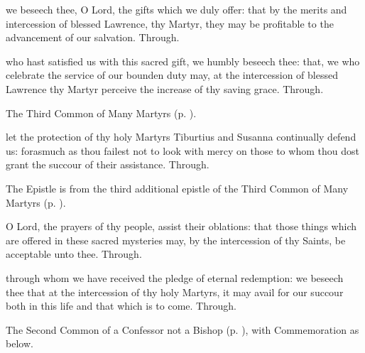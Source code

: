 
\secret
{} we beseech thee, O Lord, the gifts which we duly offer: that by the merits and intercession of blessed Lawrence, thy Martyr, they may be profitable to the advancement of our salvation. Through.


\postcommunion
{} who hast satisfied us with this sacred gift, we humbly beseech thee: that, we who celebrate the service of our bounden duty may, at the intercession of blessed Lawrence thy Martyr perceive the increase of thy saving grace. Through.



\begin{rubric}
	The Third Common of Many Martyrs (p. \pageref{CommonMartyrsIII}).
\end{rubric}

\collect
{} let the protection of thy holy Martyrs Tiburtius and Susanna continually defend us: forasmuch as thou failest not to look with mercy on those to whom thou dost grant the succour of their assistance. Through.

\begin{rubric}
	The Epistle is from the third additional epistle of the Third Common of Many Martyrs (p. \pageref{Romans818}).
\end{rubric}

\secret
{} O Lord, the prayers of thy people, assist their oblations: that those things which are offered in these sacred mysteries may, by the intercession of thy Saints, be acceptable unto thee. Through.

\postcommunion
{} through whom we have received the pledge of eternal redemption: we beseech thee that at the intercession of thy holy Martyrs, it may avail for our succour both in this life and that which is to come. Through.



\begin{rubric}
	The Second Common of a Confessor not a Bishop (p. \pageref{CommonConfessorNotBishopII}), with Commemoration  as below.
\end{rubric}


